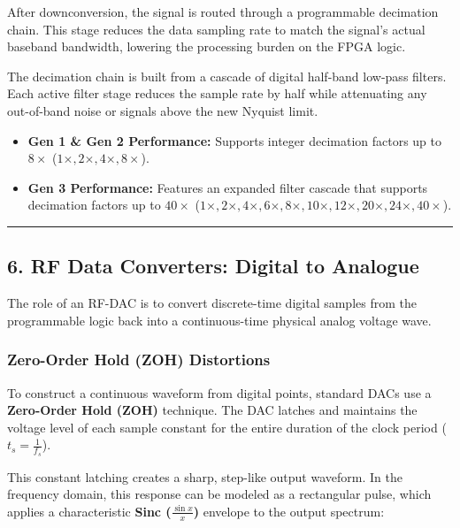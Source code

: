 \documentclass[
]{article}
\providecommand{\tightlist}{%
  \setlength{\itemsep}{0pt}\setlength{\parskip}{0pt}}
\begin{document}
After downconversion, the signal is routed through a programmable
decimation chain. This stage reduces the data sampling rate to match the
signal's actual baseband bandwidth, lowering the processing burden on
the FPGA logic.

The decimation chain is built from a cascade of digital half-band
low-pass filters. Each active filter stage reduces the sample rate by
half while attenuating any out-of-band noise or signals above the new
Nyquist limit.

\begin{itemize}
\tightlist
\item
  \textbf{Gen 1 \& Gen 2 Performance:} Supports integer decimation
  factors up to \textbf{\(8\times\)}
  (\(1\times, 2\times, 4\times, 8\times\)).
\item
  \textbf{Gen 3 Performance:} Features an expanded filter cascade that
  supports decimation factors up to \textbf{\(40\times\)}
  (\(1\times, 2\times, 4\times, 6\times, 8\times, 10\times, 12\times, 20\times, 24\times, 40\times\)).
\end{itemize}

\begin{center}\rule{0.5\linewidth}{0.5pt}\end{center}

\subsection{6. RF Data Converters: Digital to
Analogue}\label{rf-data-converters-digital-to-analogue}

The role of an RF-DAC is to convert discrete-time digital samples from
the programmable logic back into a continuous-time physical analog
voltage wave.

\subsubsection{Zero-Order Hold (ZOH)
Distortions}\label{zero-order-hold-zoh-distortions}

To construct a continuous waveform from digital points, standard DACs
use a \textbf{Zero-Order Hold (ZOH)} technique. The DAC latches and
maintains the voltage level of each sample constant for the entire
duration of the clock period (\(t_s = \frac{1}{f_s}\)).

This constant latching creates a sharp, step-like output waveform. In
the frequency domain, this response can be modeled as a rectangular
pulse, which applies a characteristic \textbf{Sinc
(\(\frac{\sin x}{x}\))} envelope to the output spectrum:
\end{document}
